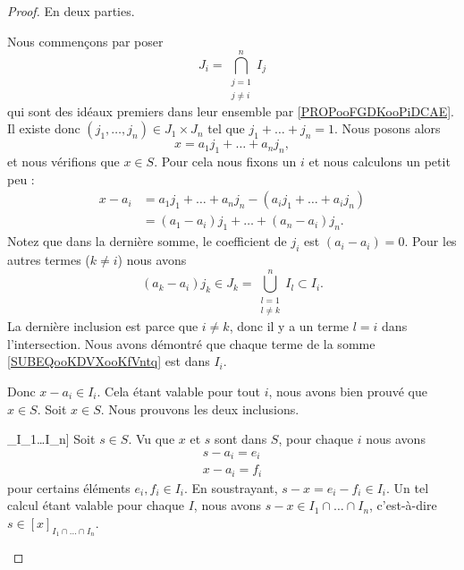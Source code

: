 \begin{proof}
	En deux parties.
	\begin{subproof}
		Nous commençons par poser
		\begin{equation}
			J_i=\bigcap_{\substack{ j=1 \\ j\neq i }  }^nI_j
		\end{equation}
		qui sont des idéaux premiers dans leur ensemble par \ref{PROPooFGDKooPiDCAE}. Il existe donc \( (j_1,\ldots,j_n)\in J_1\times J_n\) tel que \( j_1+\ldots+j_n=1\). Nous posons alors
		\begin{equation}
			x=a_1j_1+\ldots+a_nj_n,
		\end{equation}
		et nous vérifions que \( x\in S\). Pour cela nous fixons un \( i\) et nous calculons un petit peu :
		\begin{subequations}
			\begin{align}
				x-a_i & =a_1j_1+\ldots+a_nj_n-(a_ij_1+\ldots+a_ij_n)                    \\
				      & =(a_1-a_i)j_1+\ldots+(a_n-a_i)j_n.		\label{SUBEQooKDVXooKfVntq}
			\end{align}
		\end{subequations}
		Notez que dans la dernière somme, le coefficient de \( j_i\) est \( (a_i-a_i)=0\). Pour les autres termes (\( k\neq i\)) nous avons
		\begin{equation}
			(a_k-a_i)j_k\in J_k=\bigcup_{\substack{ l=1 \\ l\neq k }  }^nI_l\subset I_i.
		\end{equation}
		La dernière inclusion est parce que \( i\neq k\), donc il y a un terme \( l=i\) dans l'intersection. Nous avons démontré que chaque terme de la somme \eqref{SUBEQooKDVXooKfVntq} est dans \( I_i\).

		Donc \( x-a_i\in I_i\). Cela étant valable pour tout \( i\), nous avons bien prouvé que \( x\in S\).
		Soit \( x\in S\). Nous prouvons les deux inclusions.
		\begin{subproof}
			\spitem[\( S\subset [x]_{I_1\cap\ldots\cap I_n}\)]
			Soit \( s\in S\). Vu que \( x\) et \( s\) sont dans \( S\), pour chaque \( i\) nous avons
			\begin{subequations}
				\begin{align}
					s-a_i=e_i \\
					x-a_i=f_i
				\end{align}
			\end{subequations}
			pour certains éléments \( e_i,f_i\in I_i\). En soustrayant, \( s-x=e_i-f_i\in I_i\). Un tel calcul étant valable pour chaque \( I\), nous avons \( s-x\in I_1\cap\ldots \cap I_n\), c'est-à-dire \( s\in [x]_{I_1\cap\ldots\cap I_n}\).


\end{subproof}
\end{subproof}
\end{proof}

